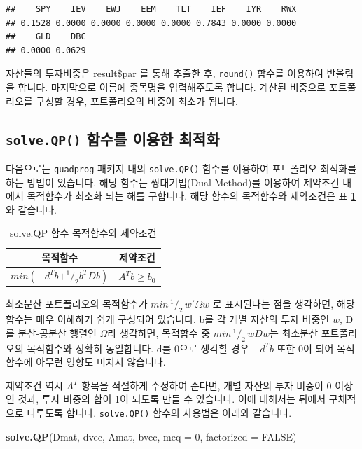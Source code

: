 \documentclass[12pt,]{book}
\newenvironment{Shaded}{\begin{snugshade}}{\end{snugshade}}
\newcommand{\DataTypeTok}[1]{\textcolor[rgb]{0.13,0.29,0.53}{#1}}
\newcommand{\DecValTok}[1]{\textcolor[rgb]{0.00,0.00,0.81}{#1}}
\newcommand{\KeywordTok}[1]{\textcolor[rgb]{0.13,0.29,0.53}{\textbf{#1}}}
\newcommand{\NormalTok}[1]{#1}
\newcommand{\OtherTok}[1]{\textcolor[rgb]{0.56,0.35,0.01}{#1}}
\begin{document}
\begin{verbatim}
##    SPY    IEV    EWJ    EEM    TLT    IEF    IYR    RWX 
## 0.1528 0.0000 0.0000 0.0000 0.0000 0.7843 0.0000 0.0000 
##    GLD    DBC 
## 0.0000 0.0629
\end{verbatim}

자산들의 투자비중은 result\$par 를 통해 추출한 후, \texttt{round()} 함수를 이용하여 반올림을 합니다. 마지막으로 이름에 종목명을 입력해주도록 합니다. 계산된 비중으로 포트폴리오를 구성할 경우, 포트폴리오의 비중이 최소가 됩니다.

\hypertarget{solve.qp---}{%
\subsection{\texorpdfstring{\texttt{solve.QP()} 함수를 이용한 최적화}{solve.QP() 함수를 이용한 최적화}}\label{solve.qp---}}

다음으로는 \texttt{quadprog} 패키지 내의 \texttt{solve.QP()} 함수를 이용하여 포트폴리오 최적화를 하는 방법이 있습니다. 해당 함수는 쌍대기법(Dual Method)를 이용하여 제약조건 내에서 목적함수가 최소화 되는 해를 구합니다. 해당 함수의 목적함수와 제약조건은 표 \ref{tab:solveqp}와 같습니다.

\begin{table}[!h]

\caption{\label{tab:solveqp}solve.QP 함수 목적함수와 제약조건}
\centering
\begin{tabular}{cc}
\toprule
목적함수 & 제약조건\\
\midrule
\rowcolor{gray!6}  $min(-d^Tb+^1/_2b^TDb)$ & $A^Tb \ge b_0$\\
\bottomrule
\end{tabular}
\end{table}

최소분산 포트폴리오의 목적함수가 \(min\,^1/_2\,w'\Omega w\) 로 표시된다는 점을 생각하면, 해당 함수는 매우 이해하기 쉽게 구성되어 있습니다. b를 각 개별 자산의 투자 비중인 \(w\), D를 분산-공분산 행렬인 \(\Omega\)라 생각하면, 목적함수 중 \(min\,^1/_2\,wDw\)는 최소분산 포트폴리오의 목적함수와 정확히 동일합니다. d를 0으로 생각할 경우 \(-d^Tb\) 또한 0이 되어 목적함수에 아무런 영향도 미치지 않습니다.

제약조건 역시 \(A^T\) 항목을 적절하게 수정하여 준다면, 개별 자산의 투자 비중이 0 이상인 것과, 투자 비중의 합이 1이 되도록 만들 수 있습니다. 이에 대해서는 뒤에서 구체적으로 다루도록 합니다. \texttt{solve.QP()} 함수의 사용법은 아래와 같습니다.

\begin{Shaded}
\begin{Highlighting}[]
\KeywordTok{solve.QP}\NormalTok{(Dmat, dvec, Amat, bvec, }\DataTypeTok{meq =} \DecValTok{0}\NormalTok{, }\DataTypeTok{factorized =} \OtherTok{FALSE}\NormalTok{)}
\end{Highlighting}
\end{Shaded}
\end{document}

